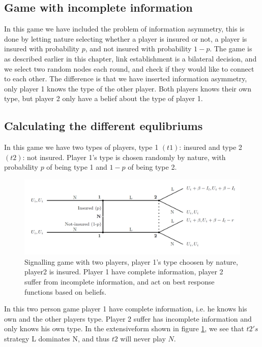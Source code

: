 \subsection{Game with incomplete information}
In this game we have included the problem of information asymmetry, this is done by letting nature selecting whether a player is insured or not, a player is insured with probability $p$, and not insured with probability $1-p$. 
The game is as described earlier in this chapter, link establishment is a bilateral decision, and we select two random nodes each round, and check if they would like to connect to each other. The difference is that we have inserted information asymmetry, only player 1 knows the type of the other player. Both players knows their own type, but player 2 only have a belief about the type of player 1.
\subsection{Calculating the different equlibriums}
In this game we have two types of players, type 1 $(t1)$: insured and type 2 $(t2)$: not insured. 
Player 1's type is chosen randomly by nature, with probability $p$ of being type 1 and $1-p$ of being type 2.
\begin{figure}[h]
\centering
  \centering
\includegraphics[width=1\linewidth]{../Figures/SignalingGameInsured.png}

\caption{Signalling game with two players, player 1's type choosen by nature, player2 is insured. Player 1 have complete information, player 2 suffer from incomplete information, and act on best response functions based on beliefs. \label{fig:signalingInsured}}

\end{figure}
In this two person game player 1 have complete information, i.e. he knows his own and the other players type. Player 2 suffer has incomplete information and only knows his own type. 
In the extensiveform shown in figure \ref{fig:signalingInsured}, we see that $t2's$ strategy L dominates N, and thus $t2$ will never play $N$.
